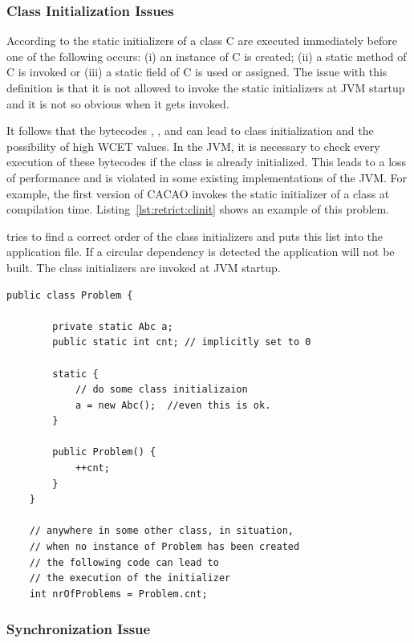 \subsubsection{Class Initialization Issues}
\label{para:restrict:clinit}

According to \cite{jvm} the static initializers of a class C are
executed immediately before one of the following occurs: (i) an
instance of C is created; (ii) a static method of C is invoked or
(iii) a static field of C is used or assigned. The issue with this
definition is that it is not allowed to invoke the static
initializers at JVM startup and it is not so obvious when it gets
invoked.

It follows that the bytecodes , ,
 and  can lead to class initialization
and the possibility of high WCET values. In the JVM, it is necessary
to check every execution of these bytecodes if the class is already
initialized. This leads to a loss of performance and is violated in
some existing implementations of the JVM. For example, the first
version of CACAO \cite{cacao} invokes the static initializer of a
class at compilation time. Listing~\ref{lst:retrict:clinit} shows an
example of this problem.

 tries to find a correct order of the class initializers
and puts this list into the application file. If a circular
dependency is detected the application will not be built. The class
initializers are invoked at JVM startup.

\begin{lstlisting}[float,caption={Class initialization can occur very late},
label=lst:retrict:clinit]
    public class Problem {

        private static Abc a;
        public static int cnt; // implicitly set to 0

        static {
            // do some class initializaion
            a = new Abc();  //even this is ok.
        }

        public Problem() {
            ++cnt;
        }
    }

    // anywhere in some other class, in situation,
    // when no instance of Problem has been created
    // the following code can lead to
    // the execution of the initializer
    int nrOfProblems = Problem.cnt;
\end{lstlisting}

\subsubsection{Synchronization Issue}

